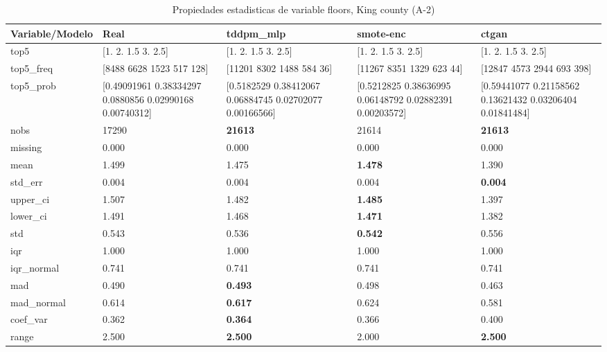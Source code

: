 \begin{table}[H]
\centering
\fontsize{8}{14}\selectfont
\caption{Propiedades  estadisticas de variable floors, King county (A-2)}
\label{table-stats-king county-a-2-floors}
\begin{tabular}{|l|m{10em}|m{10em}|m{10em}|m{10em}|}
\hline
 \rowcolor[gray]{0.8}
Variable/Modelo & Real & tddpm\_mlp & smote-enc & ctgan \\
\hline top5 & [1.  2.  1.5 3.  2.5] & [1.  2.  1.5 3.  2.5] & [1.  2.  1.5 3.  2.5] & [1.  2.  1.5 3.  2.5] \\
\hline top5\_freq & [8488 6628 1523  517  128] & [11201  8302  1488   584    36] & [11267  8351  1329   623    44] & [12847  4573  2944   693   398] \\
\hline top5\_prob & [0.49091961 0.38334297 0.0880856  0.02990168 0.00740312] & [0.5182529  0.38412067 0.06884745 0.02702077 0.00166566] & [0.5212825  0.38636995 0.06148792 0.02882391 0.00203572] & [0.59441077 0.21158562 0.13621432 0.03206404 0.01841484] \\
\hline nobs & 17290 & \bfseries 21613 & \cellcolor[rgb]{0.9, 0.54, 0.52} 21614 & \bfseries 21613 \\
\hline missing & 0.000 & 0.000 & 0.000 & 0.000 \\
\hline mean & 1.499 & 1.475 & \bfseries 1.478 & \cellcolor[rgb]{0.9, 0.54, 0.52} 1.390 \\
\hline std\_err & 0.004 & \cellcolor[rgb]{0.9, 0.54, 0.52} 0.004 & 0.004 & \bfseries 0.004 \\
\hline upper\_ci & 1.507 & 1.482 & \bfseries 1.485 & \cellcolor[rgb]{0.9, 0.54, 0.52} 1.397 \\
\hline lower\_ci & 1.491 & 1.468 & \bfseries 1.471 & \cellcolor[rgb]{0.9, 0.54, 0.52} 1.382 \\
\hline std & 0.543 & 0.536 & \bfseries 0.542 & \cellcolor[rgb]{0.9, 0.54, 0.52} 0.556 \\
\hline iqr & 1.000 & 1.000 & 1.000 & 1.000 \\
\hline iqr\_normal & 0.741 & 0.741 & 0.741 & 0.741 \\
\hline mad & 0.490 & \bfseries 0.493 & 0.498 & \cellcolor[rgb]{0.9, 0.54, 0.52} 0.463 \\
\hline mad\_normal & 0.614 & \bfseries 0.617 & 0.624 & \cellcolor[rgb]{0.9, 0.54, 0.52} 0.581 \\
\hline coef\_var & 0.362 & \bfseries 0.364 & 0.366 & \cellcolor[rgb]{0.9, 0.54, 0.52} 0.400 \\
\hline range & 2.500 & \bfseries 2.500 & \cellcolor[rgb]{0.9, 0.54, 0.52} 2.000 & \bfseries 2.500 \\

\end{tabular}
\end{table}
